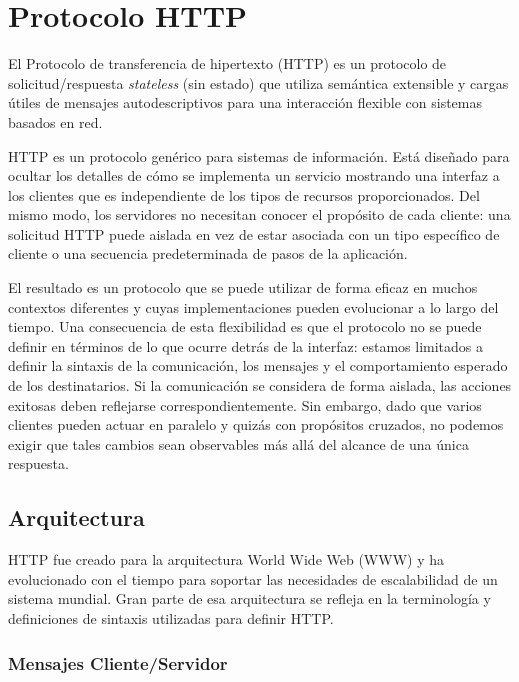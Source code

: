 \section{Protocolo HTTP}

El Protocolo de transferencia de hipertexto (HTTP) es un protocolo de 
solicitud/respuesta \emph{stateless} (sin estado) que utiliza semántica 
extensible y cargas útiles de mensajes autodescriptivos para una 
interacción flexible con sistemas basados en red.

   HTTP es un protocolo genérico para sistemas de información. Está 
   diseñado para ocultar los detalles de cómo se implementa un servicio 
   mostrando una interfaz a los clientes que es independiente de los 
   tipos de recursos proporcionados. Del mismo modo, los servidores 
   no necesitan conocer el propósito de cada cliente: una solicitud 
   HTTP puede aislada en vez de estar asociada con un tipo específico
    de cliente o una secuencia predeterminada de pasos de la aplicación.
     
    El resultado es un protocolo que se puede utilizar de forma eficaz 
     en muchos contextos diferentes y cuyas implementaciones pueden
      evolucionar a lo largo del tiempo.
   Una consecuencia de esta flexibilidad es que el protocolo no 
   se puede definir en términos de lo que ocurre detrás de la 
   interfaz: estamos limitados a definir la sintaxis de la comunicación, 
   los mensajes y el comportamiento esperado de los destinatarios. 
   Si la comunicación se considera de forma aislada, las acciones 
   exitosas deben reflejarse correspondientemente. Sin embargo, 
   dado que varios clientes pueden actuar en paralelo y quizás con
    propósitos cruzados, no podemos exigir que tales cambios sean 
    observables más allá del alcance de una única respuesta.
   
\subsection{Arquitectura}
HTTP fue creado para la arquitectura World Wide Web (WWW) y ha 
evolucionado con el tiempo para soportar las necesidades de
 escalabilidad de un sistema mundial. Gran parte de esa arquitectura 
 se refleja en la terminología y  definiciones de sintaxis utilizadas 
 para definir HTTP.

\subsubsection*{Mensajes Cliente/Servidor}


